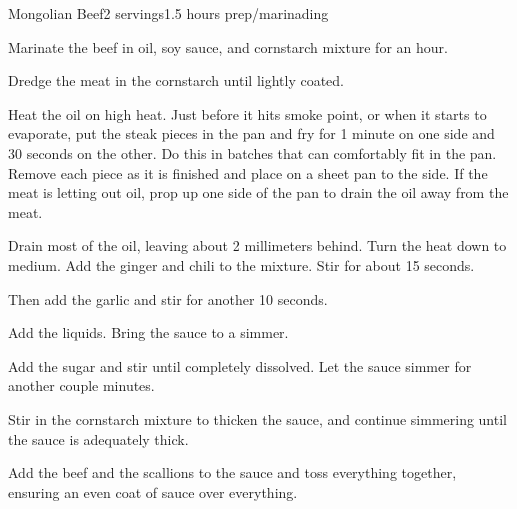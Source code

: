 \documentclass[../Cookbook.tex]{subfiles}
\begin{document}
\begin{recipe}{Mongolian Beef}{2 servings}{1.5 hours prep/marinading}

Marinate the beef in oil, soy sauce, and cornstarch mixture for an hour.

Dredge the meat in the cornstarch until lightly coated.

Heat the oil on high heat. Just before it hits smoke point, or when it starts to evaporate, put the steak pieces in the pan and fry for 1 minute on one side and 30 seconds on the other. Do this in batches that can comfortably fit in the pan.
Remove each piece as it is finished and place on a sheet pan to the side. If the meat is letting out oil, prop up one side of the pan to drain the oil away from the meat.

Drain most of the oil, leaving about 2 millimeters behind. Turn the heat down to medium.
Add the ginger and chili to the mixture. Stir for about 15 seconds.

Then add the garlic and stir for another 10 seconds.

Add the liquids. Bring the sauce to a simmer.

Add the sugar and stir until completely dissolved. Let the sauce simmer for another couple minutes.

Stir in the cornstarch mixture to thicken the sauce, and continue simmering until the sauce is adequately thick.

Add the beef and the scallions to the sauce and toss everything together, ensuring an even coat of sauce over everything.

\end{recipe}
\end{document}
